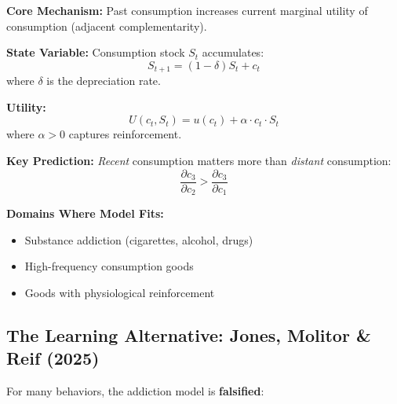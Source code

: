 \documentclass[11pt, a4paper]{article}
\begin{document}
\begin{tcolorbox}[colback=red!5!white, colframe=red!75!black,
    title=Becker \& Murphy (1988): Rational Addiction Model]

\textbf{Core Mechanism:} Past consumption increases current marginal utility of consumption (adjacent complementarity).

\textbf{State Variable:} Consumption stock $S_t$ accumulates:
\begin{equation}
S_{t+1} = (1-\delta) S_t + c_t
\end{equation}
where $\delta$ is the depreciation rate.

\textbf{Utility:}
\begin{equation}
U(c_t, S_t) = u(c_t) + \alpha \cdot c_t \cdot S_t
\end{equation}
where $\alpha > 0$ captures reinforcement.

\textbf{Key Prediction:} \textit{Recent} consumption matters more than \textit{distant} consumption:
\begin{equation}
\frac{\partial c_3}{\partial c_2} > \frac{\partial c_3}{\partial c_1}
\end{equation}

\textbf{Domains Where Model Fits:}
\begin{itemize}[nosep]
    \item Substance addiction (cigarettes, alcohol, drugs)
    \item High-frequency consumption goods
    \item Goods with physiological reinforcement
\end{itemize}

\end{tcolorbox}

\subsection{The Learning Alternative: Jones, Molitor \& Reif (2025)}

For many behaviors, the addiction model is \textbf{falsified}:
\end{document}
